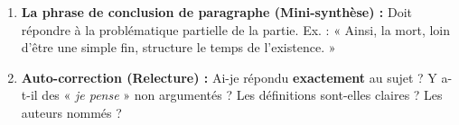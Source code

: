 \documentclass[11pt]{article}
\begin{document}
\begin{methode}
\begin{enumerate}
\begin{itemize}
        \item \textbf{Opposition / Nuance :} \emph{Toutefois, Cependant, Certes... mais, Si... cependant.}
        \item \textbf{Conséquence :} \emph{Aussi, Par conséquent, C'est pourquoi, Il s'ensuit que.}
        \item \textbf{Explication :} \emph{En effet, Car, Parce que, Puisque.}
    \end{itemize}
    \item \textbf{La phrase de conclusion de paragraphe (Mini-synthèse) :} Doit répondre à la problématique partielle de la partie. Ex. : « Ainsi, la mort, loin d'être une simple fin, structure le temps de l'existence. »
    \item \textbf{Auto-correction (Relecture) :} Ai-je répondu \textbf{exactement} au sujet ? Y a-t-il des « \emph{je pense} » non argumentés ? Les définitions sont-elles claires ? Les auteurs nommés ?
\end{enumerate}
\end{methode}
\end{document}
